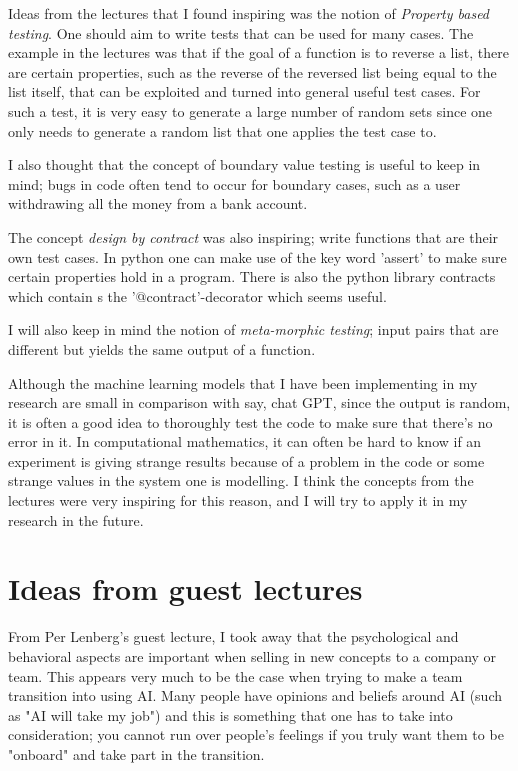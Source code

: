 \documentclass{article}
\begin{document}
Ideas from the lectures that I found inspiring was the notion of \emph{Property based testing}. One should aim to write tests that can be used for many cases. The example in the lectures was that if the goal of a function is to reverse a list, there are certain properties, such as the reverse of the reversed list being equal to the list itself, that can be exploited and turned into general useful test cases.
For such a test, it is very easy to generate a large number of random sets since one only needs to generate a random list that one applies the test case to. 

I also thought that the concept of boundary value testing is useful to keep in mind; bugs in code often tend to occur for boundary cases, such as a user withdrawing all the money from a bank account. 

The concept \emph{design by contract} was also inspiring; write functions that are their own test cases. In python one can make use of the key word 'assert' to make sure certain properties hold in a program. There is also the python library contracts which contain s the '@contract'-decorator which seems useful.

I will also keep in mind the notion of \emph{meta-morphic testing}; input pairs that are different but yields the same output of a function. 

Although the machine learning models that I have been implementing in my research are small in comparison with say, chat GPT, since the output is random, it is often a good idea to thoroughly test the code to make sure that there's no error in it. In computational mathematics, it can often be hard to know if an experiment is giving strange results because of a problem in the code or some strange values in the system one is modelling.
I think the concepts from the lectures were very inspiring for this reason, and I will try to apply it in my research in the future.

\section{Ideas from guest lectures}

From Per Lenberg's guest lecture, I took away that the psychological and behavioral aspects are important when selling in new concepts to a company or team. This appears very much to be the case when trying to make a team transition into using AI. Many people have opinions and beliefs around AI (such as "AI will take my job") and this is something that 
one has to take into consideration; you cannot run over people's feelings if you truly want them to be "onboard" and take part in the transition.
\end{document}
